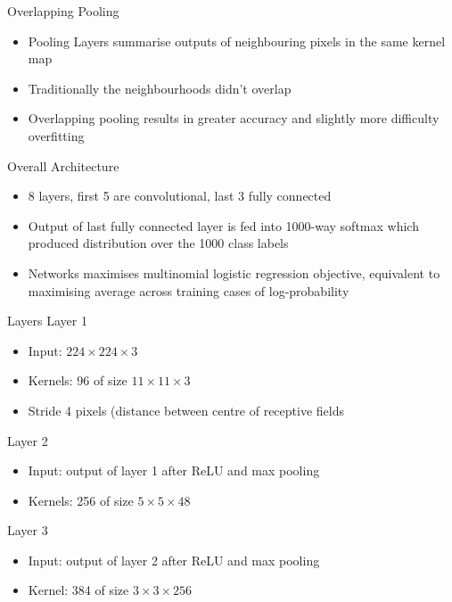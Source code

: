 \documentclass{beamer}
\begin{document}
\begin{frame}{Overlapping Pooling}
	\begin{itemize}
		\item Pooling Layers summarise outputs of neighbouring pixels in the same kernel map
		\item Traditionally the neighbourhoods didn't overlap
		\item Overlapping pooling results in greater accuracy and slightly more difficulty overfitting 
	\end{itemize}
\end{frame}


\begin{frame}{Overall Architecture}
	\begin{itemize}
		\item 8 layers, first 5 are convolutional, last 3 fully connected
		\item Output of last fully connected layer is fed into 1000-way softmax which produced distribution over the 1000 class labels
		\item Networks maximises multinomial logistic regression objective, equivalent to maximising average across training cases of log-probability
	\end{itemize}
\end{frame}

\begin{frame}{Layers}
	Layer 1
	\begin{itemize}
		\item Input: $224\times 224\times 3$
		\item Kernels: 96 of size $11\times 11 \times 3$
		\item Stride 4 pixels (distance between centre of receptive fields
	\end{itemize}
	Layer 2
	\begin{itemize}
		\item Input: output of layer 1 after ReLU and max pooling
		\item Kernels: 256 of size $5\times 5 \times 48$
	\end{itemize}
	Layer 3
	\begin{itemize}
		\item Input: output of layer 2 after ReLU and max pooling
		\item Kernel: 384 of size $3\times 3\times 256$
	\end{itemize}
	
\end{frame}
\end{document}
